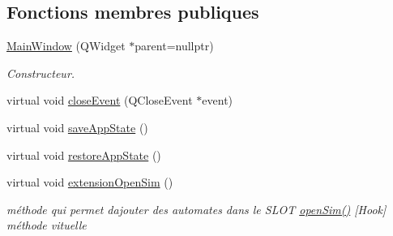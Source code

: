 \subsection*{Fonctions membres publiques}
\begin{DoxyCompactItemize}
\item 
\hyperlink{class_main_window_a996c5a2b6f77944776856f08ec30858d}{Main\+Window} (Q\+Widget $\ast$parent=nullptr)
\begin{DoxyCompactList}\small\item\em Constructeur. \end{DoxyCompactList}\item 
virtual void \hyperlink{class_main_window_a4e20a4a065fbb0e4d3532a45a0a91425}{close\+Event} (Q\+Close\+Event $\ast$event)
\item 
virtual void \hyperlink{class_main_window_a94b693e3fa35f35ba200d2427b9cd419}{save\+App\+State} ()
\item 
virtual void \hyperlink{class_main_window_ab1dbe77cfb9a4876733a540614afdec0}{restore\+App\+State} ()
\item 
virtual void \hyperlink{class_main_window_aec09ccd11397e7c8f83852ede698cf9c}{extension\+Open\+Sim} ()
\begin{DoxyCompactList}\small\item\em méthode qui permet d\textquotesingle{}ajouter des automates dans le S\+L\+OT \hyperlink{class_main_window_a13e1e518cda3c3ef508f319e5230a425}{open\+Sim()} \mbox{[}Hook\mbox{]} méthode vituelle \end{DoxyCompactList}\end{DoxyCompactItemize}
